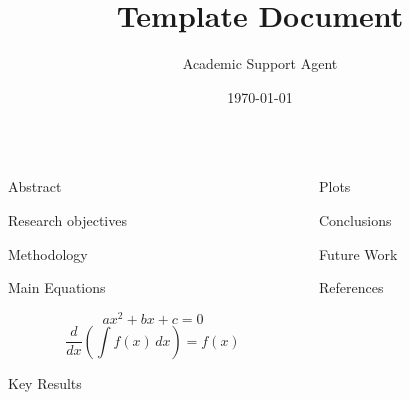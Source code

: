 \documentclass{article}
\title{Template Document}
\author{Academic Support Agent}
\date{\today}
\begin{document}
\maketitle

\fontsize{24pt}{36pt}\selectfont

\begin{frame}[t]
\begin{columns}[t]
\separatorcolumn

\begin{column}{\colwidth}

\begin{block}{Abstract}
\blindtext
\end{block}
  
\begin{exampleblock}{Research objectives}
\blindenumerate[3]
\end{exampleblock}

\begin{block}{Methodology}
\blindtext[2]
\cite{li-1984}
\end{block}

\begin{block}{Main Equations}
\lipsum[1] 

\begin{equation}
  ax^2 + bx + c = 0
\end{equation}
\lipsum[2]
\begin{equation}
  \frac{d}{dx}\left( \int f(x) \, dx \right) = f(x)
\end{equation}
\end{block}

\begin{block}{Key Results}
\blindtext[2]
\cite{WHO-2018}
\end{block}

\end{column}

\separatorcolumn

\begin{column}{\colwidth}

\begin{block}{Plots}
\blindtext    

\blindtext  


\end{block}


\begin{block}{Conclusions}
\blindtext
\end{block}

\begin{exampleblock}{Future Work}
     \blindtext
\end{exampleblock}

\begin{block}{References}
\nocite{*}
\footnotesize{}
\end{block}

\end{column}
\separatorcolumn

\end{columns}
\end{frame}
\end{document}
